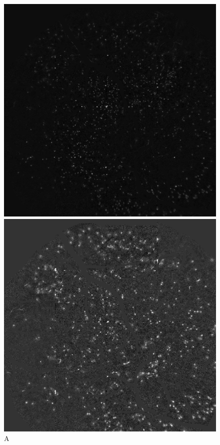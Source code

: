 \documentclass[10pt]{article}
\begin{document}
\begin{figure}[h]
    \centering

    \begin{minipage}{0.23\textwidth}
      \centering
      \includegraphics[width=\textwidth]{figs/composite_A.png}
      \caption*{A}
    \end{minipage}
    \begin{minipage}{0.23\textwidth}
      \centering
      \includegraphics[width=\textwidth]{figs/composite_B.png}

\end{minipage}
\end{figure}
\end{document}
